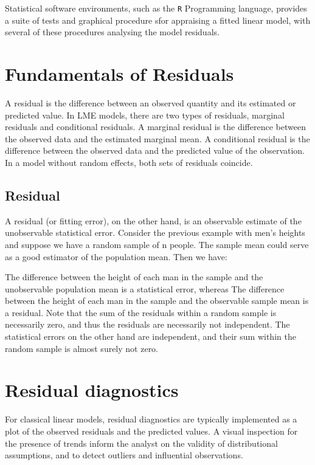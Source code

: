 \documentclass[Main.tex]{subfiles}
\begin{document}
Statistical software environments, such as the \texttt{R} Programming language, provides a suite of tests and graphical procedure sfor appraising a fitted linear model, with several 
of these procedures analysing the model residuals.

\bigskip 

\section{ Fundamentals of Residuals}


A residual is the difference between an observed quantity and its
estimated or predicted value. In LME models, there are two types
of residuals, marginal residuals and conditional residuals. A
marginal residual is the difference between the observed data and
the estimated marginal mean. A conditional residual is the
difference between the observed data and the predicted value of
the observation. In a model without random effects, both sets of
residuals coincide.

\subsection{Residual}
A residual (or fitting error), on the other hand, is an observable estimate of the unobservable statistical error. Consider the previous example with men's heights and suppose we have a random sample of n people. The sample mean could serve as a good estimator of the population mean. Then we have:

The difference between the height of each man in the sample and the unobservable population mean is a statistical error, whereas
The difference between the height of each man in the sample and the observable sample mean is a residual.
Note that the sum of the residuals within a random sample is necessarily zero, and thus the residuals are necessarily not independent. The statistical errors on the other hand are independent, and their sum within the random sample is almost surely not zero.


\section{Residual diagnostics} %
For classical linear models, residual diagnostics are typically implemented as a plot of the observed residuals and the predicted values. A visual inspection for the presence of trends inform the analyst on the validity of distributional assumptions, and to detect outliers and influential observations.
\end{document}
